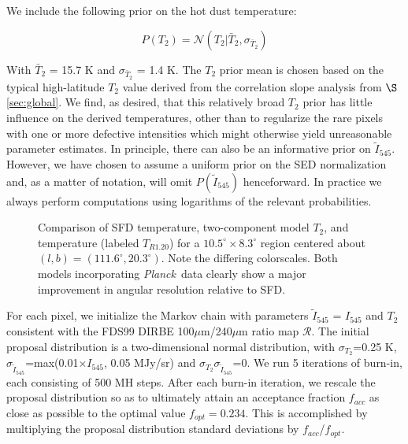 \documentclass{emulateapj}
\newcommand{\PLANCK}{{\it Planck}}
\begin{document}
We include the following prior on the hot dust temperature:

\begin{equation} \label{equ:t2prior}
P(T_2) = \mathcal{N}(T_2|\bar{T}_2, \sigma_{\bar{T}_2})
\end{equation}

With $\bar{T}_2$ = 15.7 K and $\sigma_{\bar{T}_2}$ = 1.4 K. The $T_2$ prior 
mean is chosen based on the typical high-latitude $T_2$ value derived from
the correlation slope analysis from $\S$\ref{sec:global}. We find, as 
desired, that this relatively broad $T_2$ prior has little influence on the 
derived temperatures, other than to regularize the rare pixels with one or more
defective intensities which might otherwise yield unreasonable parameter
estimates. In principle, there can also be an informative prior on 
$\tilde{I}_{545}$. However, we have chosen to assume a uniform prior on the SED
normalization and, as a matter of notation, will omit $P(\tilde{I}_{545})$ 
henceforward. In practice we always perform computations using logarithms of 
the relevant probabilities.

\begin{figure}
\begin{center}
\caption{\label{fig:comparison} Comparison of SFD temperature, two-component 
model $T_2$, and \cite{planckdust} temperature (labeled $T_{R1.20}$) for a
 $10.5^{\circ}\times8.3^{\circ}$  region centered about 
$(l,b) = (111.6^{\circ}, 20.3^{\circ})$. Note the differing colorscales. Both 
models incorporating \PLANCK~data clearly show a major improvement in angular 
resolution relative to SFD.}
\end{center}
\end{figure}

For each pixel, we initialize the Markov chain with parameters 
$\tilde{I}_{545}$ = $I_{545}$ and $T_2$ consistent with the FDS99 
DIRBE 100$\mu$m/240$\mu$m ratio map $\mathscr{R}$. The initial proposal 
distribution is a two-dimensional normal distribution, with 
$\sigma_{T_2}$=0.25 K, 
$\sigma_{\tilde{I}_{545}}$=max(0.01$\times$$I_{545}$, 0.05 MJy/sr) and
$\sigma_{T_2}\sigma_{\tilde{I}_{545}}$=0. We run 5 iterations of burn-in, each 
consisting of 500 MH steps. After each burn-in iteration, we rescale the 
proposal distribution so as to ultimately attain an acceptance fraction 
$f_{acc}$ as close as possible to the optimal value $f_{opt}=0.234$. This is 
accomplished by multiplying the proposal distribution standard deviations by 
$f_{acc}$/$f_{opt}$.
\end{document}
